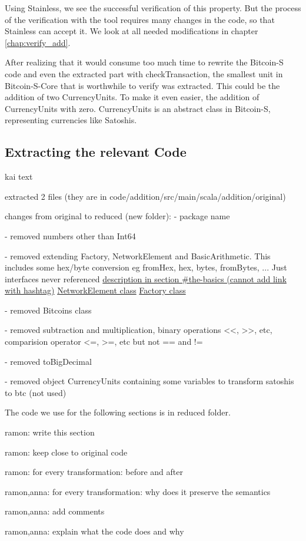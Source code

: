 \documentclass[runningheads]{llncs}
\newcommand{\todo}[1]{{\par \color{red}#1}}
\begin{document}
Using Stainless, we see the successful verification of this property.
But the process of the verification with the tool requires many
changes in the code, so that Stainless can accept it.  We look at all
needed modifications in chapter \ref{chap:verify_add}.



After realizing that it would consume too much time to rewrite the
Bitcoin-S code and even the extracted part with checkTransaction, the
smallest unit in Bitcoin-S-Core that is worthwhile to verify was
extracted.  This could be the addition of two CurrencyUnits.  To make
it even easier, the addition of CurrencyUnits with zero.
CurrencyUnits is an abstract class in Bitcoin-S, representing
currencies like Satoshis.

\subsection{Extracting the relevant Code}

\todo{
kai text

extracted 2 files (they are in code/addition/src/main/scala/addition/original)

changes from original to reduced (new folder):
  - package name

  - removed numbers other than Int64

  - removed extending Factory, NetworkElement and BasicArithmetic. This includes some hex/byte conversion eg fromHex, hex, bytes, fromBytes, ... Just interfaces never referenced
    \href{https://bitcoin-s.org/docs/core/core-intro\#the-basics}{description in section \#the-basics (cannot add link with hashtag)}
    \href{https://github.com/bitcoin-s/bitcoin-s/blob/master/core/src/main/scala/org/bitcoins/core/protocol/NetworkElement.scala}{NetworkElement class}
    \href{https://github.com/bitcoin-s/bitcoin-s/blob/master/core/src/main/scala/org/bitcoins/core/util/Factory.scala}{Factory class}

  - removed Bitcoins class

  - removed subtraction and multiplication, binary operations <<, >>, etc, comparision operator <=, >=, etc but not == and !=

  - removed toBigDecimal

  - removed object CurrencyUnits containing some variables to transform satoshis to btc (not used)

  The code we use for the following sections is in reduced folder.
}

\todo{ramon: write this section}
\todo{ramon: keep close to original code}
\todo{ramon: for every transformation: before and after}
\todo{ramon,anna: for every transformation: why does it preserve the semantics}
\todo{ramon,anna: add comments}
\todo{ramon,anna: explain what the code does and why}
\end{document}
